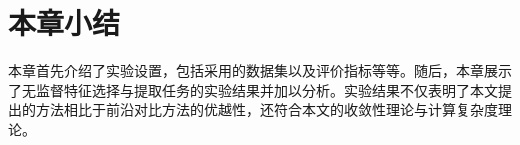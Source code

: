 \section{本章小结}
本章首先介绍了实验设置，包括采用的数据集以及评价指标等等。随后，本章展示了无监督特征选择与提取任务的实验结果并加以分析。实验结果不仅表明了本文提出的方法相比于前沿对比方法的优越性，还符合本文的收敛性理论与计算复杂度理论。

\afterpage{\null\newpage}\clearpage